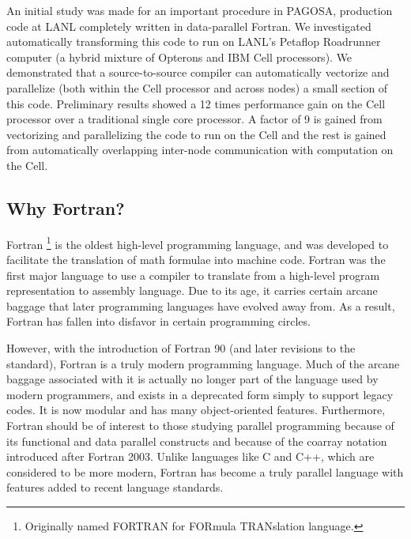 An initial study was made for an important procedure in PAGOSA,
production code at LANL completely written in data-parallel
Fortran.  We investigated automatically transforming this code
to run on LANL's Petaflop Roadrunner computer (a hybrid mixture of Opterons
and IBM Cell processors).  We demonstrated that a source-to-source compiler
can automatically vectorize and parallelize (both within the Cell processor
and across nodes) a small section of this code.  Preliminary results showed a
12 times performance gain on the Cell processor over a traditional single core
processor.  A factor of 9 is gained from vectorizing and parallelizing the
code to run on the Cell and the rest is gained from automatically overlapping
inter-node communication with computation on the Cell.



\subsection{Why Fortran?}

Fortran \footnote{Originally named FORTRAN for FORmula TRANslation language.}
is the oldest high-level programming language, and was developed to facilitate
the translation of math formulae into machine code. Fortran was the first
major language to use a compiler to translate from a high-level program
representation to assembly language. Due to its age, it carries certain arcane
baggage that later programming languages have evolved away from. As a result,
Fortran has fallen into disfavor in certain programming circles.

However, with the introduction of Fortran 90 (and later revisions to the
standard), Fortran is a truly modern programming language. Much of the arcane
baggage associated with it is actually no longer part of the language used by
modern programmers, and exists in a deprecated form simply to support legacy
codes. It is now modular and has many object-oriented features. Furthermore,
Fortran should be of interest to those studying parallel programming because
of its functional and data parallel constructs and because of the coarray
notation introduced after Fortran 2003. Unlike languages like C and C++, which
are considered to be more modern, Fortran has become a truly parallel language
with features added to recent language standards.

